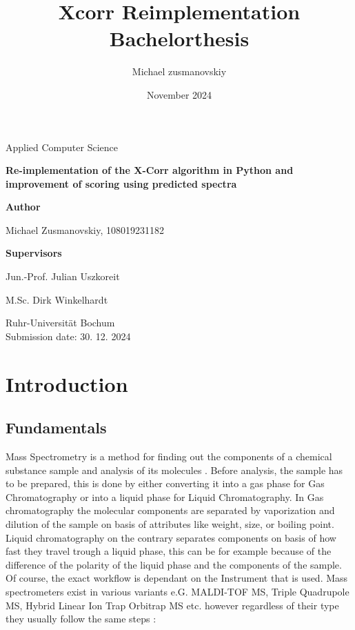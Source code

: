 \documentclass[12pt]{article}
\title{Xcorr Reimplementation Bachelorthesis}
\author{Michael zusmanovskiy}
\date{November 2024}
\begin{document}
\begin{titlepage}
    \begin{center}
        \LARGE
        Applied Computer Science

        \vspace{1.5cm}
            
        \LARGE
        \textbf{Re-implementation of the X-Corr algorithm in Python and improvement of scoring using predicted spectra}
            
        \vspace{1.5cm}

        \LARGE
        \textbf{Author}
        
        Michael Zusmanovskiy, 108019231182
        
        \vspace{1.5cm}
        
        \LARGE
        \textbf{Supervisors}
        
        Jun.-Prof. Julian Uszkoreit
        
        M.Sc. Dirk Winkelhardt
            
        \vfill
            

        \vspace{0.8cm}

        \Large
        Ruhr-Universität Bochum\\
        
        Submission date: 30. 12. 2024
            
    \end{center}
\end{titlepage}


\section{Introduction}
\subsection{Fundamentals}
Mass Spectrometry is a method for finding out the components of a chemical substance sample and analysis of its molecules \cite{mass-specrometer}. Before analysis, the sample has to be prepared, this is done by either converting it into a gas phase for Gas Chromatography or into a liquid phase for Liquid Chromatography. In Gas chromatography the molecular components are separated by vaporization and dilution of the sample on basis of attributes like weight, size, or boiling point. Liquid chromatography on the contrary separates components on basis of how fast they travel trough a liquid phase, this can be for example because of the difference of the polarity of the liquid phase and the components of the sample. Of course, the exact workflow is dependant on the Instrument that is used. Mass spectrometers exist in various variants e.G. MALDI-TOF MS, Triple Quadrupole MS, Hybrid Linear Ion Trap Orbitrap MS etc.  \cite{mass-specrometer-types} however regardless of their type they usually follow the same steps \cite{mass-specrometer, what-is-mass-spectrometry}: 
\end{document}
